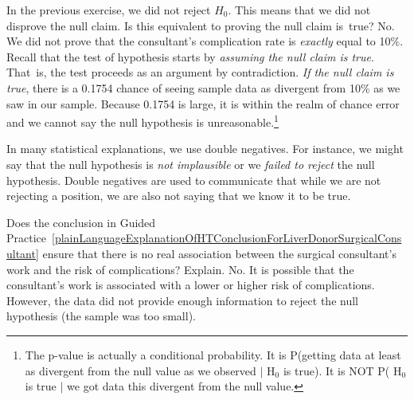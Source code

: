 \begin{example}{In the previous exercise, we did not reject $H_0$. This means that we did not disprove the null claim. Is this equivalent to proving the null claim is~true?}
No. We did not prove that the consultant's complication rate is \emph{exactly} equal to 10\%. Recall that the test of hypothesis starts by \emph{assuming the null claim is true}. That~is, the test proceeds as an argument by contradiction. \emph{If the null claim is true}, there is a 0.1754 chance of seeing sample data as divergent from 10\% as we saw in our sample. Because 0.1754 is large, it is within the realm of chance error and we cannot say the null hypothesis is unreasonable.\footnote{The p-value is actually a conditional probability. It is P(getting data at least as divergent from the null value as we observed $|$ H$_0$ is true). It is NOT P( H$_0$ is true $|$ we got data this divergent from the null value.}
\end{example}


\begin{tipBox}{
In many statistical explanations, we use double negatives. For instance, we might say that the null hypothesis is \emph{not implausible} or we \emph{failed to reject} the null hypothesis. Double negatives are used to communicate that while we are not rejecting a position, we are also not saying that we know it to be true.}
\end{tipBox}

\begin{example}{Does the conclusion in Guided Practice~\ref{plainLanguageExplanationOfHTConclusionForLiverDonorSurgicalConsultant} ensure that there is no real association between the surgical consultant's work and the risk of complications? Explain.}
No. It is possible that the consultant's work is associated with a lower or higher risk of complications. However, the data did not provide enough information to reject the null hypothesis (the sample was too small).
\end{example}




